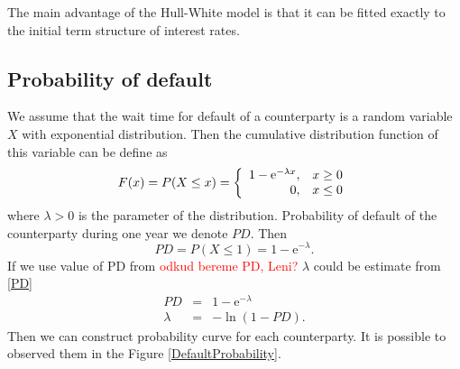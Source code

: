 \documentclass[a4paper,12pt]{report}
\theoremstyle{definition} \newtheorem{definice}[veta]{Definice}
\theoremstyle{remark}
\begin{document}
The main advantage of the Hull-White model is that it can be fitted exactly to the initial term structure of interest rates.

\subsection{Probability of default}
We assume that the wait time for default of a counterparty is a random variable $X$ with exponential distribution. Then the cumulative distribution function of this variable can be define as
\begin{equation}
F(x)= P(X\leq x)= \left\{ \begin{array}{r@{\quad}c}
    1-\mathrm{e}^{-\lambda x}, & x \geq 0 \\
    0, & x \leq 0 \\ \end{array} \right.
    \label{exponentialdistr}
\end{equation}
where $\lambda>0$ is the parameter of the distribution. Probability of default of the counterparty during one year we denote $PD$. Then 
\begin{equation}
PD=P(X\leq 1)=1-\mathrm{e}^{-\lambda}.
\label{PD}
\end{equation}
If we use value of PD from \textcolor{red}{odkud bereme PD, Leni?}  $\lambda$ could be estimate from \eqref{PD} 
\begin{eqnarray}
PD&=&1-\mathrm{e}^{-\lambda} \nonumber \\
\lambda&=&-\ln(1-PD).
\end{eqnarray}
Then we can construct probability curve for each counterparty. It is possible to observed them in the Figure \ref{DefaultProbability}.
\end{document}
